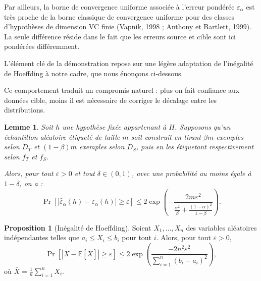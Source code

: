 \documentclass[a4paper,12pt]{article}
\newtheorem{lemma}{Lemme}[section]
\theoremstyle{definition}
\newtheorem{proposition}{Proposition}
\theoremstyle{remark}
\begin{document}
Par ailleurs, la borne de convergence uniforme associée à l’erreur pondérée $\varepsilon_\alpha$
est très proche de la borne classique de convergence uniforme pour des classes d’hypothèses
de dimension VC finie (Vapnik, 1998 ; Anthony et Bartlett, 1999). La seule différence réside
dans le fait que les erreurs source et cible sont ici pondérées différemment.

L’élément clé de la démonstration repose sur une légère adaptation de l’inégalité de Hoeffding
à notre cadre, que nous énonçons ci-dessous.

Ce comportement traduit un compromis naturel : plus on fait confiance aux données cible,
moins il est nécessaire de corriger le décalage entre les distributions.\\

\begin{lemma}
Soit $h$ une hypothèse fixée appartenant à $H$. Supposons qu’un échantillon aléatoire
étiqueté de taille $m$ soit construit en tirant $\beta m$ exemples selon $D_T$ et
$(1 - \beta)m$ exemples selon $D_S$, puis en les étiquetant respectivement selon $f_T$
et $f_S$.

Alors, pour tout $\varepsilon > 0$ et tout $\delta \in (0,1)$, avec une probabilité au moins
égale à $1 - \delta$, on a :
\[
\Pr\left[ \left| \hat{\varepsilon}_\alpha(h) - \varepsilon_\alpha(h) \right| \geq \varepsilon \right]
\leq 2 \exp\left(
- \frac{2m \varepsilon^2}{\frac{\alpha^2}{\beta} + \frac{(1-\alpha)^2}{1-\beta}}
\right).
\]
\end{lemma}

\begin{proposition}[Inégalité de Hoeffding]
Soient $X_1, \dots, X_n$ des variables aléatoires indépendantes telles que
$a_i \leq X_i \leq b_i$ pour tout $i$. Alors, pour tout $\varepsilon > 0$,
\[
\Pr\left[ \left| \bar{X} - \mathbb{E}[\bar{X}] \right| \geq \varepsilon \right]
\leq 2 \exp\left(
\frac{-2n^2 \varepsilon^2}{\sum_{i=1}^n (b_i - a_i)^2}
\right),
\]
où $\bar{X} = \frac{1}{n} \sum_{i=1}^n X_i$.
\end{proposition}
\end{document}
